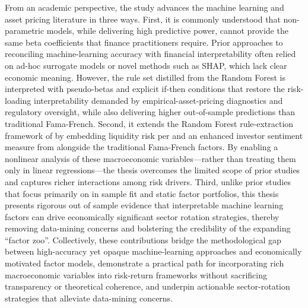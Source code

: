 From an academic perspective, the study advances the machine learning and asset pricing literature in three ways. First, it is commonly understood that non-parametric models, while delivering high predictive power, cannot provide the same beta coefficients that finance practitioners require. Prior approaches to reconciling machine-learning accuracy with financial interpretability often relied on ad-hoc surrogate models or novel methods such as SHAP, which lack clear economic meaning. However, the rule set distilled from the Random Forest is interpreted with pseudo-betas and explicit if-then conditions that restore the risk-loading interpretability demanded by empirical-asset-pricing diagnostics and regulatory oversight, while also delivering higher out-of-sample predictions than traditional Fama-French. Second, it extends the Random Forest rule-extraction framework of  by embedding liquidity risk per  and an enhanced investor sentiment measure from  alongside the traditional Fama-French factors. By enabling a nonlinear analysis of these macroeconomic variables—rather than treating them only in linear regressions—the thesis overcomes the limited scope of prior studies and captures richer interactions among risk drivers. Third, unlike prior studies that focus primarily on in sample fit and static factor portfolios, this thesis presents rigorous out of sample evidence that interpretable machine learning factors can drive economically significant sector rotation strategies, thereby removing data-mining concerns and bolstering the credibility of the expanding “factor zoo”. Collectively, these contributions bridge the methodological gap between high-accuracy yet opaque machine-learning approaches and economically motivated factor models, demonstrate a practical path for incorporating rich macroeconomic variables into risk-return frameworks without sacrificing transparency or theoretical coherence, and underpin actionable sector-rotation strategies that alleviate data-mining concerns.


